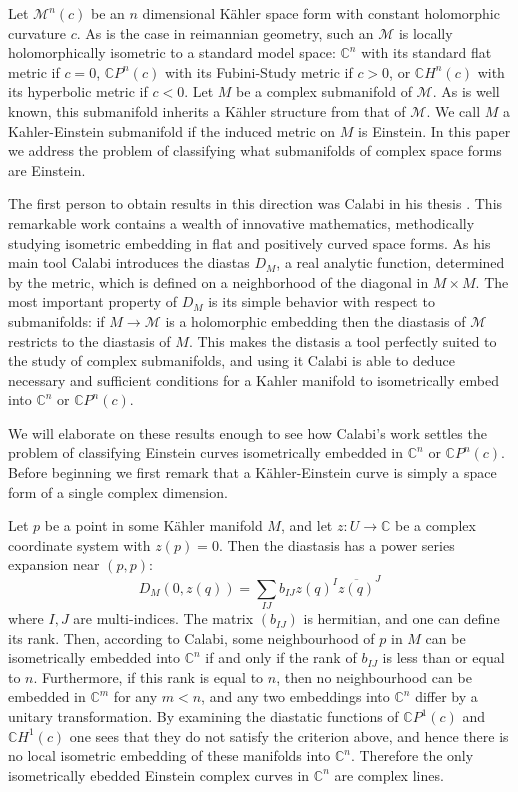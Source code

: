 \documentclass[11pt]{amsart}
\theoremstyle{definition}
\def \CP{ \mathbb{C}P }
\def \C{ \mathbb{C} }
\def \CH{ \mathbb{C}H }
\def \Mamb{ \mathcal{M} }
\begin{document}
\parskip 6pt
\parindent 0pt
\baselineskip 14pt

Let $\Mamb^n(c)$ be an $n$ dimensional K\"{a}hler space form with constant holomorphic curvature $c$.  As is the case in reimannian geometry, such an $\Mamb$ is locally holomorphically isometric to a standard model space: $\C^n$ with its standard flat metric if $c=0$, $\CP^n(c)$ with its Fubini-Study metric if $c>0$, or $\CH^n(c)$ with its hyperbolic metric if $c<0$.  Let $M$ be a complex submanifold of $\Mamb$.  As is well known, this submanifold inherits a K\"{a}hler structure from that of $\Mamb$.  We call $M$ a Kahler-Einstein submanifold if the induced metric on $M$ is Einstein.  In this paper we address the problem of classifying what submanifolds of complex space forms are Einstein.

The first person to obtain results in this direction was Calabi in his thesis \cite{C1}.  This remarkable work contains a wealth of innovative mathematics, methodically studying isometric embedding in flat and positively curved space forms.  As his main tool Calabi introduces the diastas $D_M$, a real analytic function, determined by the metric, which is defined on a neighborhood of the diagonal in $M \times M$.  The most important property of $D_M$ is its simple behavior with respect to submanifolds:  if $M \rightarrow \Mamb$ is a holomorphic embedding then the diastasis of $\Mamb$ restricts to the diastasis of $M$.  This makes the distasis a tool perfectly suited to the study of complex submanifolds, and using it Calabi is able to deduce necessary and sufficient conditions for a Kahler manifold to isometrically embed into $\C^n$ or $\CP^n(c)$.  

We will elaborate on these results enough to see how Calabi's work settles the problem of classifying Einstein curves isometrically embedded in $\C^n$ or $\CP^n(c)$.  Before beginning we first remark that a K\"{a}hler-Einstein curve is simply a space form of a single complex dimension.  

Let $p$ be a point in some K\"{a}hler manifold $M$, and let $z:U \rightarrow \C$ be a complex coordinate system with $z(p) = 0$.  Then the diastasis has a power series expansion near $(p,p)$:
%
$$ D_M(0, z(q)) = \sum_{IJ} b_{IJ} z(q)^I \overline{z(q)}^J $$
%
where $I,J$ are multi-indices.  The matrix $(b_{IJ})$ is hermitian, and one can define its rank.  Then, according to Calabi, some neighbourhood of $p$ in $M$ can be isometrically embedded into $\C^n$ if and only if the rank of $b_{IJ}$ is less than or equal to $n$.  Furthermore, if this rank is equal to $n$, then no neighbourhood can be embedded in $\C^{m}$ for any $m < n$, and any two embeddings into $\C^n$ differ by a unitary transformation.  By examining the diastatic functions of $\CP^{1}(c)$ and $\CH^{1}(c)$ one sees that they do not satisfy the criterion above, and hence there is no local isometric embedding of these manifolds into $\C^n$.  Therefore the only isometrically ebedded Einstein complex curves in $\C^n$ are complex lines.
\end{document}
